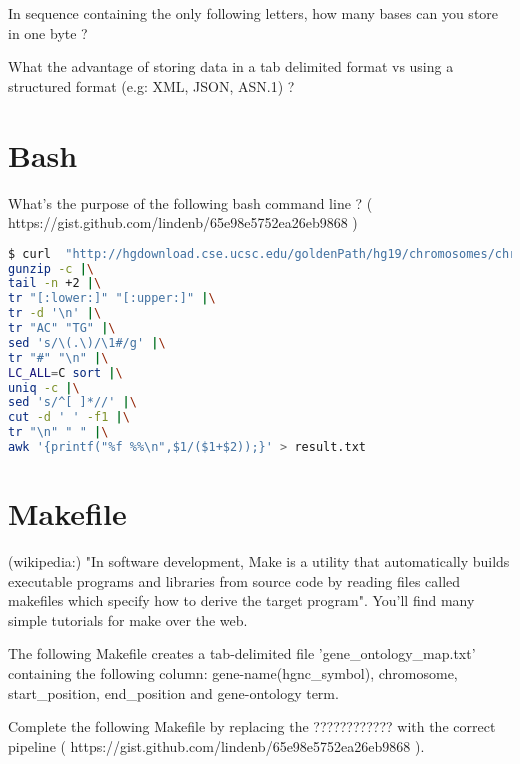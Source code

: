 \documentclass{article}
\begin{document}
In sequence containing the only following letters, how many bases can you store in one byte ?

What the advantage of storing data in a tab delimited format vs using a structured format (e.g: XML, JSON, ASN.1) ?

\section{Bash}

What's the purpose of the following bash command line ? ( https://gist.github.com/lindenb/65e98e5752ea26eb9868 )

\begin{lstlisting}[language=bash]
$ curl  "http://hgdownload.cse.ucsc.edu/goldenPath/hg19/chromosomes/chrM.fa.gz" |\
gunzip -c |\
tail -n +2 |\
tr "[:lower:]" "[:upper:]" |\
tr -d '\n' |\
tr "AC" "TG" |\
sed 's/\(.\)/\1#/g' |\
tr "#" "\n" |\
LC_ALL=C sort |\
uniq -c |\
sed 's/^[ ]*//' |\
cut -d ' ' -f1 |\
tr "\n" " " |\
awk '{printf("%f %%\n",$1/($1+$2));}' > result.txt
\end{lstlisting}

\section{Makefile}
(wikipedia:) "In software development, Make is a utility that automatically builds executable programs and libraries from source code by reading files called makefiles which specify how to derive the target program". You'll find many simple tutorials for make over the web.

The following Makefile creates a tab-delimited file 'gene\_ontology\_map.txt' containing the following column: gene-name(hgnc\_symbol), chromosome, start\_position, end\_position and gene-ontology term.

Complete the following Makefile by replacing the ???????????? with the correct pipeline ( https://gist.github.com/lindenb/65e98e5752ea26eb9868 ).
\end{document}
